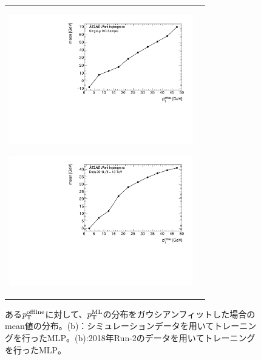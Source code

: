 \begin{figure}
    \begin{tabular}{cc}
    \centering
    \begin{minipage}[b]{0.45\hsize}%
        \centering
        \hspace*{-1cm}
        \includegraphics[clip, width=8cm]{fig/4/predtrue_MC_v1.pdf}
        \subcaption{}
        \label{}
    \end{minipage}%
    \begin{minipage}[b]{0.7\hsize}%
        \centering
        \includegraphics[clip, width=8cm]{fig/4/predtrue_v1.pdf}
        \subcaption{}
        \label{MC_input}
    \end{minipage}%
    \end{tabular}
    \caption{ある$p_{\rm{T}}^{\rm{offline}}$に対して、$p_{\rm{T}}^{\rm{ML}}$の分布をガウシアンフィットした場合のmean値の分布。(b)：シミュレーションデータを用いてトレーニングを行ったMLP。(b):2018年Run-2のデータを用いてトレーニングを行ったMLP。}
    \label{fig:Gausmu}
\end{figure}


